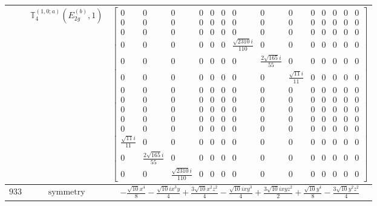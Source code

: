 \documentclass[fleqn,8pt,landscape]{jsarticle}
\begin{document}
\begin{longtable}{ccc}
$  $ & $ \mathbb{T}_{4}^{(1,0;a)}(E_{2g}^{(b)},1) $ & $ \begin{bmatrix} 0 & 0 & 0 & 0 & 0 & 0 & 0 & 0 & 0 & 0 & 0 & 0 & 0 & 0 \\ 0 & 0 & 0 & 0 & 0 & 0 & 0 & 0 & 0 & 0 & 0 & 0 & 0 & 0 \\ 0 & 0 & 0 & 0 & 0 & 0 & 0 & 0 & 0 & 0 & 0 & 0 & 0 & 0 \\ 0 & 0 & 0 & 0 & 0 & 0 & \frac{\sqrt{2310} i}{110} & 0 & 0 & 0 & 0 & 0 & 0 & 0 \\ 0 & 0 & 0 & 0 & 0 & 0 & 0 & \frac{2 \sqrt{165} i}{55} & 0 & 0 & 0 & 0 & 0 & 0 \\ 0 & 0 & 0 & 0 & 0 & 0 & 0 & 0 & \frac{\sqrt{11} i}{11} & 0 & 0 & 0 & 0 & 0 \\ 0 & 0 & 0 & 0 & 0 & 0 & 0 & 0 & 0 & 0 & 0 & 0 & 0 & 0 \\ 0 & 0 & 0 & 0 & 0 & 0 & 0 & 0 & 0 & 0 & 0 & 0 & 0 & 0 \\ 0 & 0 & 0 & 0 & 0 & 0 & 0 & 0 & 0 & 0 & 0 & 0 & 0 & 0 \\ 0 & 0 & 0 & 0 & 0 & 0 & 0 & 0 & 0 & 0 & 0 & 0 & 0 & 0 \\ 0 & 0 & 0 & 0 & 0 & 0 & 0 & 0 & 0 & 0 & 0 & 0 & 0 & 0 \\ \frac{\sqrt{11} i}{11} & 0 & 0 & 0 & 0 & 0 & 0 & 0 & 0 & 0 & 0 & 0 & 0 & 0 \\ 0 & \frac{2 \sqrt{165} i}{55} & 0 & 0 & 0 & 0 & 0 & 0 & 0 & 0 & 0 & 0 & 0 & 0 \\ 0 & 0 & \frac{\sqrt{2310} i}{110} & 0 & 0 & 0 & 0 & 0 & 0 & 0 & 0 & 0 & 0 & 0 \end{bmatrix} $ \\ \hline
$ 933 $ & $ \text{symmetry} $ & $ - \frac{\sqrt{10} x^{4}}{8} - \frac{\sqrt{10} i x^{3} y}{4} + \frac{3 \sqrt{10} x^{2} z^{2}}{4} - \frac{\sqrt{10} i x y^{3}}{4} + \frac{3 \sqrt{10} i x y z^{2}}{2} + \frac{\sqrt{10} y^{4}}{8} - \frac{3 \sqrt{10} y^{2} z^{2}}{4} $ \\

\end{longtable}
\end{document}
